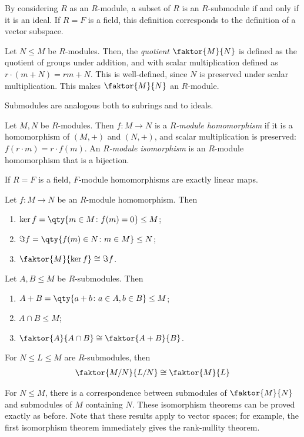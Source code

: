 \begin{example}
	By considering $R$ as an $R$-module, a subset of $R$ is an $R$-submodule if and only if it is an ideal.
	If $R = F$ is a field, this definition corresponds to the definition of a vector subspace.
\end{example}
\begin{definition}
	Let $N \leq M$ be $R$-modules.
	Then, the \textit{quotient} $\faktor{M}{N}$ is defined as the quotient of groups under addition, and with scalar multiplication defined as $r \cdot (m + N) = rm + N$.
	This is well-defined, since $N$ is preserved under scalar multiplication.
	This makes $\faktor{M}{N}$ an $R$-module.
\end{definition}
\begin{remark}
	Submodules are analogous both to subrings and to ideals.
\end{remark}
\begin{definition}
	Let $M, N$ be $R$-modules.
	Then $f \colon M \to N$ is a \textit{$R$-module homomorphism} if it is a homomorphism of $(M, +)$ and $(N, +)$, and scalar multiplication is preserved: $f(r \cdot m) = r \cdot f(m)$.
	An \textit{$R$-module isomorphism} is an $R$-module homomorphism that is a bijection.
\end{definition}
\begin{example}
	If $R = F$ is a field, $F$-module homomorphisms are exactly linear maps.
\end{example}
\begin{theorem}
	Let $f \colon M \to N$ be an $R$-module homomorphism.
	Then
	\begin{enumerate}
		\item $\ker f = \qty{m \in M \colon f(m) = 0} \leq M$;
		\item $\Im f = \qty{f(m) \in N \colon m \in M} \leq N$;
		\item $\faktor{M}{\ker f} \cong \Im f$.
	\end{enumerate}
\end{theorem}
\begin{theorem}
	Let $A, B \leq M$ be $R$-submodules.
	Then
	\begin{enumerate}
		\item $A + B = \qty{a + b \colon a \in A, b \in B} \leq M$;
		\item $A \cap B \leq M$;
		\item $\faktor{A}{A \cap B} \cong \faktor{A + B}{B}$.
	\end{enumerate}
\end{theorem}
\begin{theorem}
	For $N \leq L \leq M$ are $R$-submodules, then
	\begin{align*}
		\faktor{M/N}{L/N} \cong \faktor{M}{L}
	\end{align*}
\end{theorem}
For $N \leq M$, there is a correspondence between submodules of $\faktor{M}{N}$ and submodules of $M$ containing $N$.
These isomorphism theorems can be proved exactly as before.
Note that these results apply to vector spaces; for example, the first isomorphism theorem immediately gives the rank-nullity theorem.

